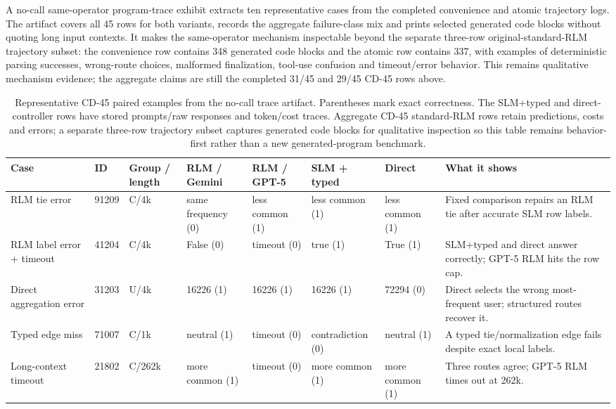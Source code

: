 \documentclass[letterpaper]{article}
\begin{document}
A no-call same-operator program-trace exhibit extracts ten representative cases from the completed convenience and atomic trajectory logs. The artifact covers all 45 rows for both variants, records the aggregate failure-class mix and prints selected generated code blocks without quoting long input contexts. It makes the same-operator mechanism inspectable beyond the separate three-row original-standard-RLM trajectory subset: the convenience row contains 348 generated code blocks and the atomic row contains 337, with examples of deterministic parsing successes, wrong-route choices, malformed finalization, tool-use confusion and timeout/error behavior. This remains qualitative mechanism evidence; the aggregate claims are still the completed 31/45 and 29/45 CD-45 rows above.

\begin{table}[!t]
\centering
\small
\setlength{\tabcolsep}{3pt}
\begin{tabular}{@{}p{2.2cm}p{1.5cm}p{1.3cm}p{1.8cm}p{1.8cm}p{1.7cm}p{1.7cm}p{3.3cm}@{}}
\toprule
\textbf{Case} & \textbf{ID} & \textbf{Group / length} & \textbf{RLM / Gemini} & \textbf{RLM / GPT-5} & \textbf{SLM + typed} & \textbf{Direct} & \textbf{What it shows} \\
\midrule
RLM tie error & 91209\allowbreak0010 & C/4k & same frequency (0) & less common (1) & less common (1) & less common (1) & Fixed comparison repairs an RLM tie after accurate SLM row labels. \\
RLM label error + timeout & 41204\allowbreak0009 & C/4k & False (0) & timeout (0) & true (1) & True (1) & SLM+typed and direct answer correctly; GPT-5 RLM hits the row cap. \\
Direct aggregation error & 31203\allowbreak0020 & U/4k & 16226 (1) & 16226 (1) & 16226 (1) & 72294 (0) & Direct selects the wrong most-frequent user; structured routes recover it. \\
Typed edge miss & 71007\allowbreak0026 & C/1k & neutral (1) & timeout (0) & contradiction (0) & neutral (1) & A typed tie/normalization edge fails despite exact local labels. \\
Long-context timeout & 21802\allowbreak0026 & C/262k & more common (1) & timeout (0) & more common (1) & more common (1) & Three routes agree; GPT-5 RLM times out at 262k. \\
\bottomrule
\end{tabular}
\caption{Representative CD-45 paired examples from the no-call trace artifact. Parentheses mark exact correctness. The SLM+typed and direct-controller rows have stored prompts/raw responses and token/cost traces. Aggregate CD-45 standard-RLM rows retain predictions, costs and errors; a separate three-row trajectory subset captures generated code blocks for qualitative inspection so this table remains behavior-first rather than a new generated-program benchmark.}
\label{tab:supp-cd45-trace-examples}
\end{table}
\end{document}
